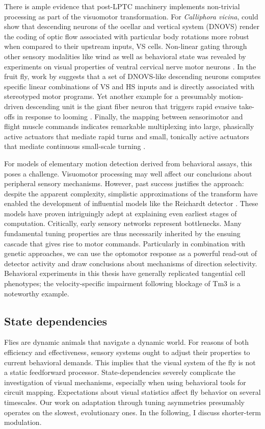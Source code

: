 There is ample evidence that post-LPTC machinery implements non-trivial processing as part of the visuomotor transformation. For \textit{Calliphora vicina}, \citet{Wertz:2009hb} could show that descending neurons of the ocellar and vertical system (DNOVS) render the coding of optic flow associated with particular body rotations more robust when compared to their upstream inputs, VS cells. Non-linear gating through other sensory modalities like wind as well as behavioral state was revealed by experiments on visual properties of ventral cervical nerve motor neurons \citep{Haag:2010fy}. In the fruit fly, work by \citet{Suver:2016aa} suggests that a set of DNOVS-like descending neurons computes specific linear combinations of VS and HS inputs and is directly associated with stereotyped motor programs. Yet another example for a presumably motion-driven descending unit is the giant fiber neuron that triggers rapid evasive take-offs in response to looming \citep{Reyn:2014aa}. Finally, the mapping between sensorimotor and flight muscle commands indicates remarkable multiplexing into large, phasically active actuators that mediate rapid turns and small, tonically active actuators that mediate continuous small-scale turning \citep{Lindsay:2017aa}.

For models of elementary motion detection derived from behavioral assays, this poses a challenge. Visuomotor processing may well affect our conclusions about peripheral sensory mechanisms. However, past success justifies the approach: despite the apparent complexity, simplistic approximations of the transform have enabled the development of influential models like the Reichardt detector \citep{Hassenstein:1956fa}. These models have proven intriguingly adept at explaining even earliest stages of computation. Critically, early sensory networks represent bottlenecks. Many fundamental tuning properties are thus necessarily inherited by the ensuing cascade that gives rise to motor commands. Particularly in combination with genetic approaches, we can use the optomotor response as a powerful read-out of detector activity and draw conclusions about mechanisms of direction selectivity. Behavioral experiments in this thesis have generally replicated tangential cell phenotypes; the velocity-specific impairment following blockage of Tm3 is a noteworthy example.


\subsection{State dependencies}
Flies are dynamic animals that navigate a dynamic world. For reasons of both efficiency and effectiveness, sensory systems ought to adjust their properties to current behavioral demands. This implies that the visual system of the fly is not a static feedforward processor. State-dependencies severely complicate the investigation of visual mechanisms, especially when using behavioral tools for circuit mapping. Expectations about visual statistics affect fly behavior on several timescales. Our work on adaptation through tuning asymmetries presumably operates on the slowest, evolutionary ones. In the following, I discuss shorter-term modulation.

